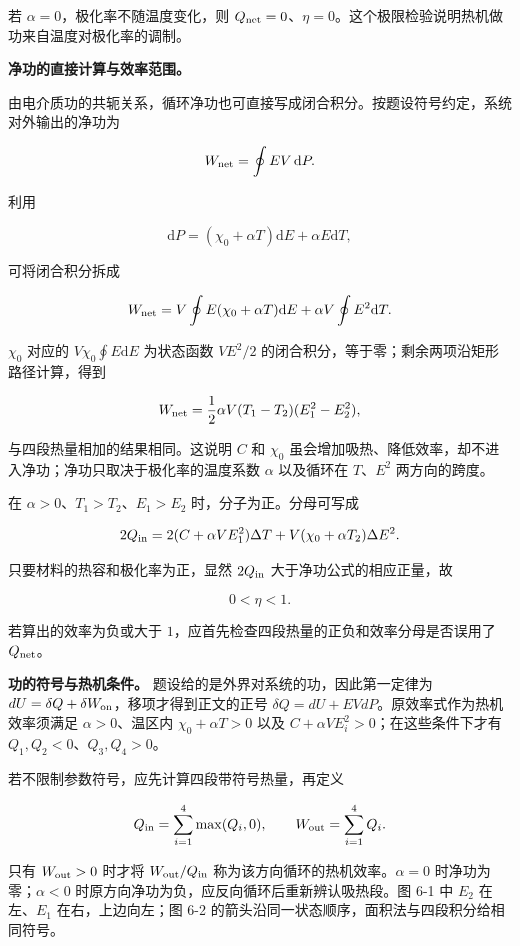 \documentclass[12pt,a4paper,UTF8]{ctexart}
\begin{document}
若 \(\alpha=0\)，极化率不随温度变化，则
\(Q_{\rm net}=0\)、\(\eta=0\)。这个极限检验说明热机做功来自温度对极化率的调制。

\textbf{净功的直接计算与效率范围。}

由电介质功的共轭关系，循环净功也可直接写成闭合积分。按题设符号约定，系统对外输出的净功为

\[W_{\rm net}=\oint EV\,\mathrm dP.\]

利用

\[\mathrm dP=(\chi_0+\alpha T)\mathrm dE+\alpha E\mathrm dT,\]

可将闭合积分拆成

\[W_{\rm net}
=V\oint E(\chi_0+\alpha T)\mathrm dE
+\alpha V\oint E^2\mathrm dT.\]

\(\chi_0\) 对应的 \(V\chi_0\oint E\mathrm dE\) 为状态函数 \(VE^2/2\)
的闭合积分，等于零；剩余两项沿矩形路径计算，得到

\[W_{\rm net}=\frac12\alpha V(T_1-T_2)(E_1^2-E_2^2),\]

与四段热量相加的结果相同。这说明 \(C\) 和 \(\chi_0\)
虽会增加吸热、降低效率，却不进入净功；净功只取决于极化率的温度系数
\(\alpha\) 以及循环在 \(T\)、\(E^2\) 两方向的跨度。

在 \(\alpha>0\)、\(T_1>T_2\)、\(E_1>E_2\) 时，分子为正。分母可写成

\[2Q_{\rm in}
=2(C+\alpha VE_1^2)\Delta T
+V(\chi_0+\alpha T_2)\Delta E^2.\]

只要材料的热容和极化率为正，显然 \(2Q_{\rm in}\)
大于净功公式的相应正量，故

\[0<\eta<1.\]

若算出的效率为负或大于
\(1\)，应首先检查四段热量的正负和效率分母是否误用了 \(Q_{\rm net}\)。

\textbf{功的符号与热机条件。} 题设给的是外界对系统的功，因此第一定律为
\(dU=\delta Q+\delta W_{\rm on}\)，移项才得到正文的正号
\(\delta Q=dU+EVdP\)。原效率式作为热机效率须满足 \(\alpha>0\)、温区内
\(\chi_0+\alpha T>0\) 以及 \(C+\alpha VE_i^2>0\)；在这些条件下才有
\(Q_1,Q_2<0\)、\(Q_3,Q_4>0\)。

若不限制参数符号，应先计算四段带符号热量，再定义

\[Q_{\rm in}=\sum_{i=1}^4\max(Q_i,0),\qquad W_{\rm out}=\sum_{i=1}^4Q_i.\]

只有 \(W_{\rm out}>0\) 时才将 \(W_{\rm out}/Q_{\rm in}\)
称为该方向循环的热机效率。\(\alpha=0\) 时净功为零；\(\alpha<0\)
时原方向净功为负，应反向循环后重新辨认吸热段。图 6-1 中 \(E_2\)
在左、\(E_1\) 在右，上边向左；图 6-2
的箭头沿同一状态顺序，面积法与四段积分给相同符号。
\end{document}
